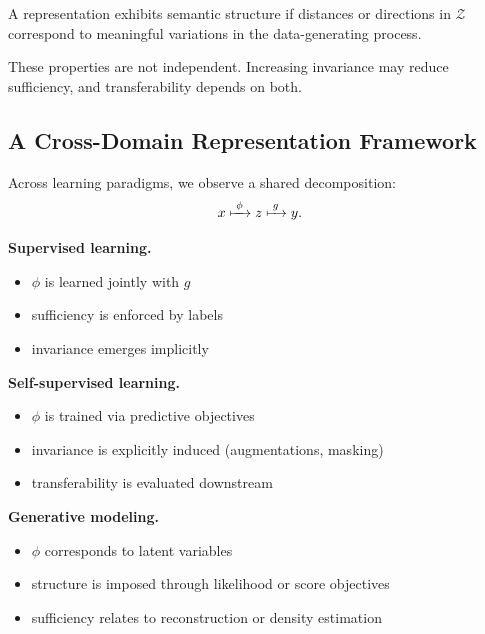 \begin{definition}
A representation exhibits semantic structure if distances or directions in $\mathcal{Z}$ correspond to meaningful variations in the data-generating process.
\end{definition}

\begin{remark}
These properties are not independent. Increasing invariance may reduce sufficiency, and transferability depends on both.
\end{remark}

\subsection{A Cross-Domain Representation Framework}

Across learning paradigms, we observe a shared decomposition:
\[
x \xmapsto{\;\phi\;} z \xmapsto{\;g\;} y.
\]

\medskip

\noindent
\textbf{Supervised learning.}
\begin{itemize}
\item $\phi$ is learned jointly with $g$
\item sufficiency is enforced by labels
\item invariance emerges implicitly
\end{itemize}

\medskip

\noindent
\textbf{Self-supervised learning.}
\begin{itemize}
\item $\phi$ is trained via predictive objectives
\item invariance is explicitly induced (augmentations, masking)
\item transferability is evaluated downstream
\end{itemize}

\medskip

\noindent
\textbf{Generative modeling.}
\begin{itemize}
\item $\phi$ corresponds to latent variables
\item structure is imposed through likelihood or score objectives
\item sufficiency relates to reconstruction or density estimation
\end{itemize}

\medskip

